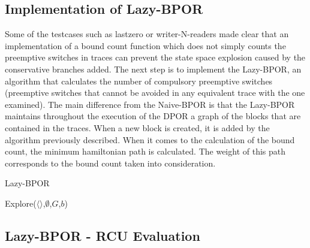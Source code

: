 \subsection{Implementation of Lazy-BPOR}

Some of the testcases such as lastzero or writer-N-readers made clear that an implementation of a bound count function which does not simply counts the preemptive switches in traces can prevent
the state space explosion caused by the conservative branches added. The next step is to implement the Lazy-BPOR, an algorithm that calculates the number of compulsory
preemptive switches (preemptive switches that cannot be avoided in any equivalent trace with the one examined). The main difference from the Naive-BPOR is that
the Lazy-BPOR maintains throughout the execution of the DPOR a graph of the blocks that are contained in the traces. When a new block is created, it is added by the
algorithm previously described. When it comes to the calculation of the bound count, the minimum hamiltonian path is calculated. The weight of this path corresponds
to the bound count taken into consideration.

\begin{algorithm}
    \caption{Lazy-BPOR}
    \label{Lazy-BPOR}
    Explore($\langle \rangle$,$\emptyset$,$G$,$b$)\;
\end{algorithm}


\subsection{Lazy-BPOR - RCU Evaluation}


